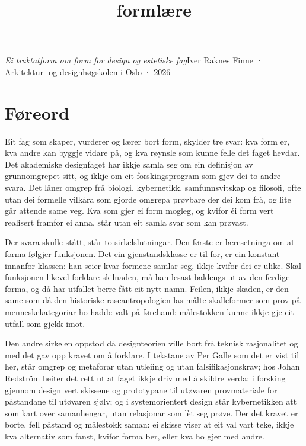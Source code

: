 

\title{formlære}

\emph{Ei traktatform om form for design og estetiske fag}\newline{}Iver Raknes Finne · Arkitektur- og designhøgskolen i Oslo · 2026

\section{Føreord}

Eit fag som skaper, vurderer og lærer bort form, skylder tre svar: kva form er, kva andre kan byggje vidare på, og kva røynsle som kunne felle det faget hevdar. Det akademiske designfaget har ikkje samla seg om ein definisjon av grunnomgrepet sitt, og ikkje om eit forskingsprogram som gjev dei to andre svara. Det låner omgrep frå biologi, kybernetikk, samfunnsvitskap og filosofi, ofte utan dei formelle vilkåra som gjorde omgrepa prøvbare der dei kom frå, og lite går attende same veg. Kva som gjer ei form mogleg, og kvifor éi form vert realisert framfor ei anna, står utan eit samla svar som kan prøvast.

Der svara skulle stått, står to sirkelslutningar. Den første er læresetninga om at forma følgjer funksjonen. Det ein gjenstandsklasse er til for, er ein konstant innanfor klassen: han seier kvar formene samlar seg, ikkje kvifor dei er ulike. Skal funksjonen likevel forklare skilnaden, må han lesast baklengs ut av den ferdige forma, og då har utfallet berre fått eit nytt namn. Feilen, ikkje skaden, er den same som då den historiske raseantropologien las målte skalleformer som prov på menneskekategoriar ho hadde valt på førehand: målestokken kunne ikkje gje eit utfall som gjekk imot.

Den andre sirkelen oppstod då designteorien ville bort frå teknisk rasjonalitet og med det gav opp kravet om å forklare. I tekstane av Per Galle som det er vist til her, står omgrep og metaforar utan utleiing og utan falsifikasjonskrav; hos Johan Redström heiter det rett ut at faget ikkje driv med å skildre verda; i forsking gjennom design vert skissene og prototypane til utøvaren provmateriale for påstandane til utøvaren sjølv; og i systemorientert design står kybernetikken att som kart over samanhengar, utan relasjonar som lèt seg prøve. Der det kravet er borte, fell påstand og målestokk saman: ei skisse viser at eit val vart teke, ikkje kva alternativ som fanst, kvifor forma ber, eller kva ho gjer med andre.

